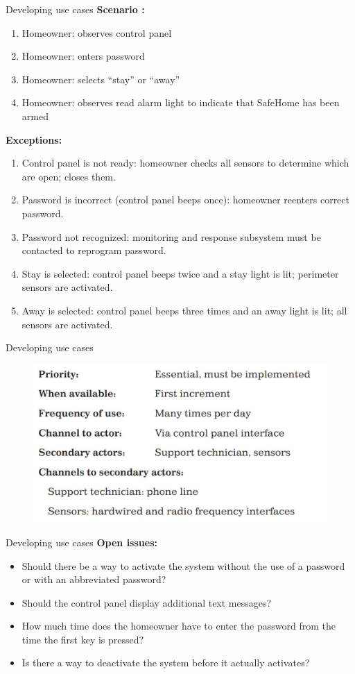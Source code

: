 \documentclass{beamer}
\begin{document}
\begin{frame}{Developing use cases}
	\textbf{Scenario :}
	\begin{enumerate}
		\item Homeowner: observes control panel 
		\item Homeowner: enters password 
		\item Homeowner: selects “stay” or “away” 
		\item Homeowner: observes read alarm light to indicate that SafeHome has been armed
	\end{enumerate}
\textbf{Exceptions: }
\begin{enumerate}
	\item  Control panel is not ready: homeowner checks all sensors to determine which are 
	open; closes them. 
	\item Password is incorrect (control panel beeps once): homeowner reenters correct 
	password. 
\item Password not recognized: monitoring and response subsystem must be contacted 
	to reprogram password. 
\item Stay is selected: control panel beeps twice and a stay light is lit; perimeter sensors 
	are activated. 
	\item Away is selected: control panel beeps three times and an away light is lit; all 
	sensors are activated.
\end{enumerate}
\end{frame}
\begin{frame}{Developing use cases}
	
	\begin{figure}
		\includegraphics[scale=.5]{img/m2_18.jpg}
	\end{figure}
\end{frame}
\begin{frame}{Developing use cases}
	\textbf{Open issues: }
	\begin{itemize}
		\item Should there be a way to activate the system without the use of a password or with 
		an abbreviated password? 
	\item Should the control panel display additional text messages? 
	\item How much time does the homeowner have to enter the password from the time the 
		first key is pressed? 
	\item Is there a way to deactivate the system before it actually activates? 
	\end{itemize}
\end{frame}
\end{document}
